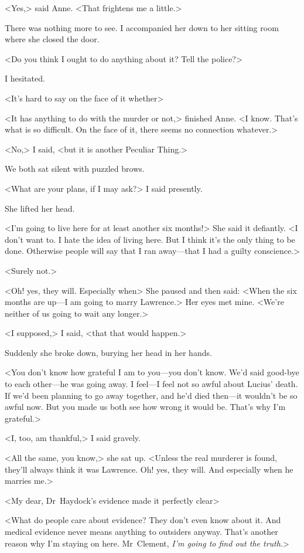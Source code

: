 <Yes,> said Anne. <That frightens me a little.>

There was nothing more to see. I accompanied her down to her sitting room where she closed the door.

<Do you think I ought to do anything about it? Tell the police?>

I hesitated.

<It's hard to say on the face of it whether\longdash>

<It has anything to do with the murder or not,> finished Anne. <I know. That's what is so difficult. On the face of it, there seems no connection whatever.>

<No,> I said, <but it is another Peculiar Thing.>

We both sat silent with puzzled brows.

<What are your plans, if I may ask?> I said presently.

She lifted her head.

<I'm going to live here for at least another six months!> She said it defiantly. <I don't want to. I hate the idea of living here. But I think it's the only thing to be done. Otherwise people will say that I ran away—that I had a guilty conscience.>

<Surely not.>

<Oh! yes, they will. Especially when\longdash> She paused and then said: <When the six months are up—I am going to marry Lawrence.> Her eyes met mine. <We're neither of us going to wait any longer.>

<I supposed,> I said, <that that would happen.>

Suddenly she broke down, burying her head in her hands.

<You don't know how grateful I am to you—you don't know. We'd said good-bye to each other—he was going away. I feel—I feel not so awful about Lucius' death. If we'd been planning to go away together, and he'd died then—it wouldn't be so awful now. But you made us both see how wrong it would be. That's why I'm grateful.>

<I, too, am thankful,> I said gravely.

<All the same, you know,> she sat up. <Unless the real murderer is found, they'll always think it was Lawrence. Oh! yes, they will. And especially when he marries me.>

<My dear, Dr~Haydock's evidence made it perfectly clear\longdash>

<What do people care about evidence? They don't even know about it. And medical evidence never means anything to outsiders anyway. That's another reason why I'm staying on here. Mr~Clement, \emph{I'm going to find out the truth}.>

